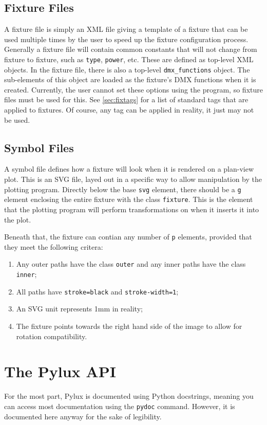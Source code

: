 \documentclass[a4paper]{article}
\begin{document}
\subsection{Fixture Files}
A fixture file is simply an XML file giving a template of a fixture that can 
be used multiple times by the user to speed up the fixture configuration 
process. Generally a fixture file will contain common constants that will not 
change from fixture to fixture, such as \texttt{type}, \texttt{power}, etc. 
These are defined as top-level XML objects. In the fixture file, there is also 
a top-level \texttt{dmx\_functions} object. The sub-elements of this object 
are loaded as the fixture's DMX functions when it is created. Currently, the 
user cannot set these options using the program, so fixture files must be 
used for this. See \autoref{sec:fixtags} for a list of standard tags that 
are applied to fixtures. Of course, any tag can be applied in reality, it 
just may not be used.

\subsection{Symbol Files}
A symbol file defines how a fixture will look when it is rendered on a 
plan-view plot. This is an SVG file, layed out in a specific way to allow 
manipulation by the plotting program. Directly below the base \texttt{svg} 
element, there should be a \texttt{g} element enclosing the entire fixture 
with the class \texttt{fixture}. This is the element that the plotting 
program will perform transformations on when it inserts it into the plot. 

Beneath that, the fixture can contian any number of \texttt{p} elements, 
provided that they meet the following critera:
\begin{enumerate}
\item Any outer paths have the class \texttt{outer} and any inner paths have 
the class \texttt{inner};
\item All paths have \texttt{stroke=black} and \texttt{stroke-width=1};
\item An SVG unit represents 1mm in reality;
\item The fixture points towards the right hand side of the image to allow for 
rotation compatibility.
\end{enumerate}

\section{The Pylux API}
For the most part, Pylux is documented using Python docstrings, meaning you 
can access most documentation using the \texttt{pydoc} command. However, it 
is documented here anyway for the sake of legibility.
\end{document}
